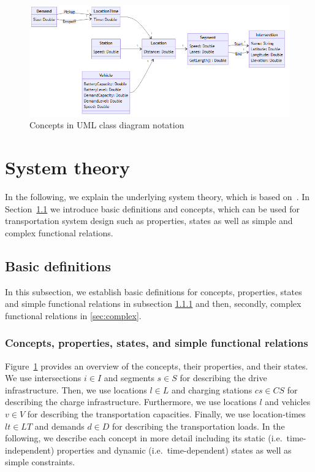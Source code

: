 \documentclass[graybox]{svmult}
\begin{document}
\begin{figure}[t]
	\centering
	\includegraphics[scale=0.35]{../../diagrams/model/classes-v0.png}
	\caption{Concepts in UML class diagram notation}
	\label{fig:concepts}
\end{figure}

\newpage

\section{System theory}
\label{sec:theory}
In the following, we explain the underlying system theory, which is based on~\cite{Ascher2014,Ascher2015,Ascher2016,Ascher2017}.
In Section~\ref{sec:concepts} we introduce basic definitions and concepts, which can be used for transportation system design such as properties, states as well as simple and complex functional relations. 


\subsection{Basic definitions}
\label{sec:concepts}
In this subsection, we establish basic definitions for concepts, properties, states and simple functional relations in subsection \ref{sec:simple} and then, secondly, complex functional relations in \ref{sec:complex}.

\subsubsection{Concepts, properties, states, and simple functional relations}
\label{sec:simple}
Figure~\ref{fig:concepts} provides an overview of the concepts, their properties, and their states.
We use intersections $i \in I$ and segments $s \in S$ for describing the drive infrastructure.
Then, we use locations $l \in L$ and charging stations $cs \in CS$ for describing the charge infrastructure.
Furthermore, we use locations $l$ and vehicles $v \in V$ for describing the transportation capacities.
Finally, we use location-times $lt \in LT$ and demands $d \in D$ for describing the transportation loads.
In the following, we describe each concept in more detail including its static (i.e.\ time-independent) properties and dynamic (i.e.\ time-dependent) states as well as simple constraints.
\end{document}
